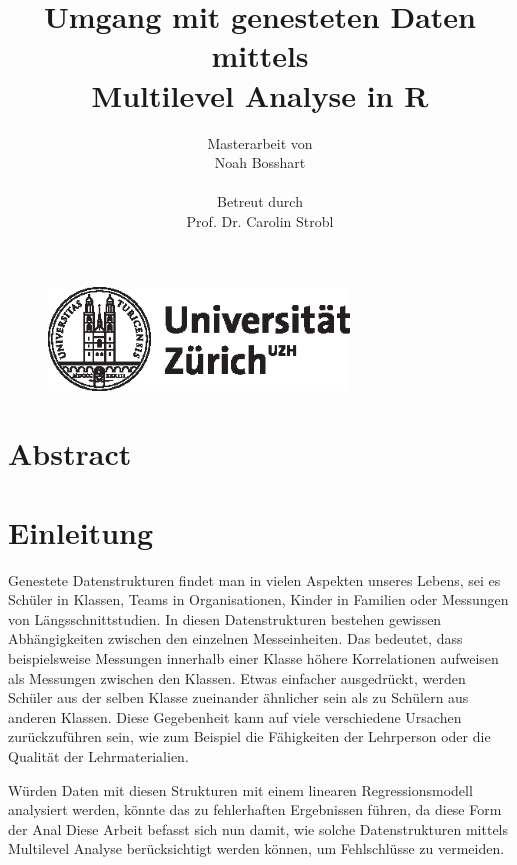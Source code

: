 \documentclass[12pt]{article}\usepackage[]{graphicx}\usepackage[]{color}
\title{Umgang mit genesteten Daten mittels \\ Multilevel Analyse in R}
\author{Masterarbeit von \\ Noah Bosshart \\ \\ Betreut durch \\ Prof. Dr. Carolin Strobl}
\begin{document}
\begin{figure}[t]
  \centering
  \includegraphics[width = 8cm]{uzh_logo}
\end{figure}

\maketitle

\newpage
\tableofcontents

\newpage
\section{Abstract}

\newpage

\section{Einleitung}
Genestete Datenstrukturen findet man in vielen Aspekten unseres Lebens, sei es Schüler in Klassen, Teams in Organisationen, Kinder in Familien oder Messungen von Längsschnittstudien. In diesen Datenstrukturen bestehen gewissen Abhängigkeiten zwischen den einzelnen Messeinheiten. Das bedeutet, dass beispielsweise Messungen innerhalb einer Klasse höhere Korrelationen aufweisen als Messungen zwischen den Klassen. Etwas einfacher ausgedrückt, werden Schüler aus der selben Klasse zueinander ähnlicher sein als zu Schülern aus anderen Klassen. Diese Gegebenheit kann auf viele verschiedene Ursachen zurückzuführen sein, wie zum Beispiel die Fähigkeiten der Lehrperson oder die Qualität der Lehrmaterialien. 


Würden Daten mit diesen Strukturen mit einem linearen Regressionsmodell analysiert werden, könnte das zu fehlerhaften Ergebnissen führen, da diese Form der Anal Diese Arbeit befasst sich nun damit, wie solche Datenstrukturen  mittels Multilevel Analyse berücksichtigt werden können, um Fehlschlüsse zu vermeiden.
\end{document}
